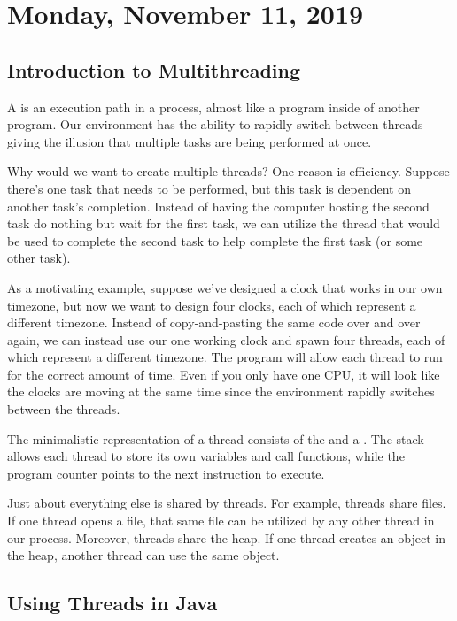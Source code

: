 \section{Monday, November 11, 2019}
\subsection{Introduction to Multithreading}

A  is an execution path in a process, almost like a program inside of another program. Our environment has the ability to rapidly switch between threads giving the illusion that multiple tasks are being performed at once.

Why would we want to create multiple threads? One reason is efficiency. Suppose there's one task that needs to be performed, but this task is dependent on another task's completion. Instead of having the computer hosting the second task do nothing but wait for the first task, we can utilize the thread that would be used to complete the second task to help complete the first task (or some other task). 

As a motivating example, suppose we've designed a clock that works in our own timezone, but now we want to design four clocks, each of which represent a different timezone. Instead of copy-and-pasting the same code over and over again, we can instead use our one working clock and spawn four threads, each of which represent a different timezone. The program will allow each thread to run for the correct amount of time. Even if you only have one CPU, it will look like the clocks are moving at the same time since the environment rapidly switches between the threads. 


The minimalistic representation of a thread consists of the  and a . The stack allows each thread to store its own variables and call functions, while the program counter points to the next instruction to execute. 


Just about everything else is shared by threads. For example, threads share files. If one thread opens a file, that same file can be utilized by any other thread in our process. Moreover, threads share the heap. If one thread creates an object in the heap, another thread can use the same object. 

\subsection{Using Threads in Java}


